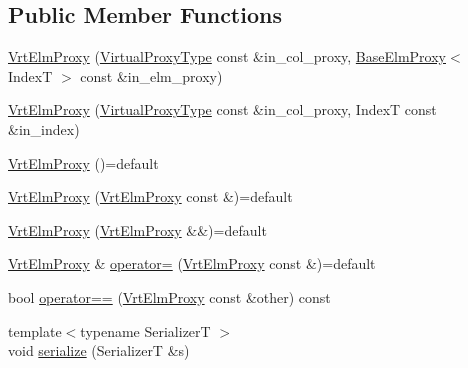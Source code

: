 \subsection*{Public Member Functions}
\begin{DoxyCompactItemize}
\item 
\hyperlink{structvt_1_1vrt_1_1collection_1_1_vrt_elm_proxy_adb4f84aeca6d61b39b1a460c0b4f215a}{Vrt\+Elm\+Proxy} (\hyperlink{namespacevt_a1b417dd5d684f045bb58a0ede70045ac}{Virtual\+Proxy\+Type} const \&in\+\_\+col\+\_\+proxy, \hyperlink{structvt_1_1vrt_1_1collection_1_1_base_elm_proxy}{Base\+Elm\+Proxy}$<$ IndexT $>$ const \&in\+\_\+elm\+\_\+proxy)
\item 
\hyperlink{structvt_1_1vrt_1_1collection_1_1_vrt_elm_proxy_a99d6e37bddf85ab0b3030ce7ab519f04}{Vrt\+Elm\+Proxy} (\hyperlink{namespacevt_a1b417dd5d684f045bb58a0ede70045ac}{Virtual\+Proxy\+Type} const \&in\+\_\+col\+\_\+proxy, IndexT const \&in\+\_\+index)
\item 
\hyperlink{structvt_1_1vrt_1_1collection_1_1_vrt_elm_proxy_a9dcec470fca637dedf608a402facca14}{Vrt\+Elm\+Proxy} ()=default
\item 
\hyperlink{structvt_1_1vrt_1_1collection_1_1_vrt_elm_proxy_ac0ac82f67b1a4d2e3cbd52ebdf32cc7a}{Vrt\+Elm\+Proxy} (\hyperlink{structvt_1_1vrt_1_1collection_1_1_vrt_elm_proxy}{Vrt\+Elm\+Proxy} const \&)=default
\item 
\hyperlink{structvt_1_1vrt_1_1collection_1_1_vrt_elm_proxy_a451958f72d1dc1a5633ada75558cc5f5}{Vrt\+Elm\+Proxy} (\hyperlink{structvt_1_1vrt_1_1collection_1_1_vrt_elm_proxy}{Vrt\+Elm\+Proxy} \&\&)=default
\item 
\hyperlink{structvt_1_1vrt_1_1collection_1_1_vrt_elm_proxy}{Vrt\+Elm\+Proxy} \& \hyperlink{structvt_1_1vrt_1_1collection_1_1_vrt_elm_proxy_a74d7dc399b099347ebb01ece6a7ab025}{operator=} (\hyperlink{structvt_1_1vrt_1_1collection_1_1_vrt_elm_proxy}{Vrt\+Elm\+Proxy} const \&)=default
\item 
bool \hyperlink{structvt_1_1vrt_1_1collection_1_1_vrt_elm_proxy_aaa0d1284499b6714cc4462ecc03580bb}{operator==} (\hyperlink{structvt_1_1vrt_1_1collection_1_1_vrt_elm_proxy}{Vrt\+Elm\+Proxy} const \&other) const
\item 
{\footnotesize template$<$typename SerializerT $>$ }\\void \hyperlink{structvt_1_1vrt_1_1collection_1_1_vrt_elm_proxy_a0f076b094fe6bca6bf27df607d79ccf0}{serialize} (SerializerT \&s)
\end{DoxyCompactItemize}
